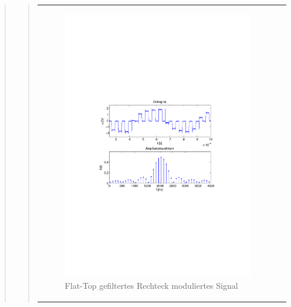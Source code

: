 \begin{quote}
\begin{quote}
\begin{center}
\begin{tabular}{ll}
            \hspace{-5cm}
                \begin{minipage}{0.6\textwidth}
                    \begin{figure}[H]
                        \includegraphics[scale=0.55, trim = 16mm 70mm 16mm 85mm, clip]{Bilder/flatrecFil20_05abget_zeit}
                          \caption{Flat-Top gefiltertes Rechteck moduliertes Signal}
		                  \label{fig:flatrecFil20_05zeit}
                    \end{figure}
                \end{minipage}
                

\end{tabular}
\end{center}
\end{quote}
\end{quote}
